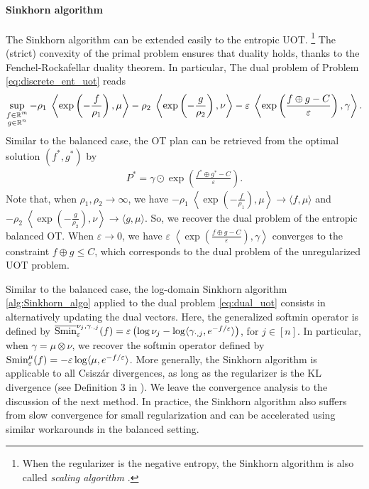\paragraph{Sinkhorn algorithm} The Sinkhorn algorithm can be extended easily to the entropic UOT.
\footnote{When the regularizer is the negative entropy, the Sinkhorn algorithm is also called
\textit{scaling algorithm} \citep{Chizat18a}.} The (strict) convexity of the primal problem ensures
that duality holds, thanks to the Fenchel-Rockafellar duality theorem. In particular,
The dual problem of Problem \eqref{eq:discrete_ent_uot} reads
\begin{align}
  \label{eq:dual_uot}
  \sup_{\substack{f \in \mathbb R^m \\ g \in \mathbb R^n}}
  -\rho_1 \; \left\langle \exp \left( - \frac{f}{\rho_1}\right), \mu \right\rangle
  -\rho_2 \; \left\langle \exp \left( - \frac{g}{\rho_2} \right), \nu \right\rangle
  - \varepsilon \; \left\langle \exp
  \left( \frac{f \oplus g - C}{\varepsilon} \right), \gamma \right\rangle.
\end{align}
Similar to the balanced case, the OT plan can be retrieved from the optimal solution $(f^*, g^*)$ by
\begin{align}
  P^* = \gamma \odot \exp \left( \frac{f^* \oplus g^* - C}{\varepsilon} \right).
\end{align}
Note that, when $\rho_1, \rho_2 \to \infty$, we have
$-\rho_1 \; \left\langle \exp \left( - \frac{f}{\rho_1}\right), \mu \right\rangle \to
\langle f, \mu \rangle$ and
$-\rho_2 \; \left\langle \exp \left( - \frac{g}{\rho_2} \right), \nu \right\rangle \to \langle g, \mu \rangle$.
So, we recover the dual problem of the entropic balanced OT.
When $\varepsilon \to 0$, we have
$\varepsilon \; \left\langle \exp \left( \frac{f \oplus g - C}{\varepsilon} \right), \gamma \right\rangle$
converges to the constraint $f \oplus g \leq C$, which corresponds to the dual problem of the
unregularized UOT problem.

Similar to the balanced case, the log-domain Sinkhorn algorithm \ref{alg:Sinkhorn_algo}
applied to the dual problem \eqref{eq:dual_uot} consists in alternatively updating the dual vectors.
Here, the generalized softmin operator is defined by
$\overline{\text{Smin}}^{\nu_j, \gamma_{\cdot, j}}_{\varepsilon}(f) =
\varepsilon \left( \log \nu_j - \log \langle \gamma_{\cdot, j}, e^{-f / \varepsilon} \rangle \right)$,
for $j \in [n]$. In particular, when $\gamma = \mu \otimes \nu$, we recover the softmin operator
\citep{Sejourne19} defined by
$\text{Smin}^{\mu}_{\varepsilon}(f) = -\varepsilon \log \langle \mu, e^{-f / \varepsilon} \rangle$.
More generally, the Sinkhorn algorithm is applicable to all Csiszár divergences,
as long as the regularizer is the KL divergence (see Definition 3 in \citep{Sejourne19}).
We leave the convergence analysis to the discussion of the next method.
In practice, the Sinkhorn algorithm also suffers from slow convergence for small regularization
and can be accelerated using similar workarounds in the balanced setting.

